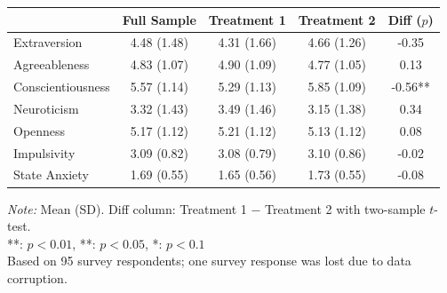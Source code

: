 \begingroup
\centering
\small
\begin{tabular}{lcccc}
\toprule
 & Full Sample & Treatment 1 & Treatment 2 & Diff ($p$) \\
\midrule
  Extraversion & 4.48 (1.48) & 4.31 (1.66) & 4.66 (1.26) & -0.35 \\
  Agreeableness & 4.83 (1.07) & 4.90 (1.09) & 4.77 (1.05) & 0.13 \\
  Conscientiousness & 5.57 (1.14) & 5.29 (1.13) & 5.85 (1.09) & -0.56** \\
  Neuroticism & 3.32 (1.43) & 3.49 (1.46) & 3.15 (1.38) & 0.34 \\
  Openness & 5.17 (1.12) & 5.21 (1.12) & 5.13 (1.12) & 0.08 \\
  Impulsivity & 3.09 (0.82) & 3.08 (0.79) & 3.10 (0.86) & -0.02 \\
  State Anxiety & 1.69 (0.55) & 1.65 (0.56) & 1.73 (0.55) & -0.08 \\
\bottomrule
\end{tabular}
\par
\vspace{2pt}
{\footnotesize \textit{Note:} Mean (SD). Diff column: Treatment 1 $-$ Treatment 2 with two-sample $t$-test.}\\
{\footnotesize ***: $p<0.01$, **: $p<0.05$, *: $p<0.1$}\\
{\footnotesize Based on 95 survey respondents; one survey response was lost due to data corruption.}
\endgroup
